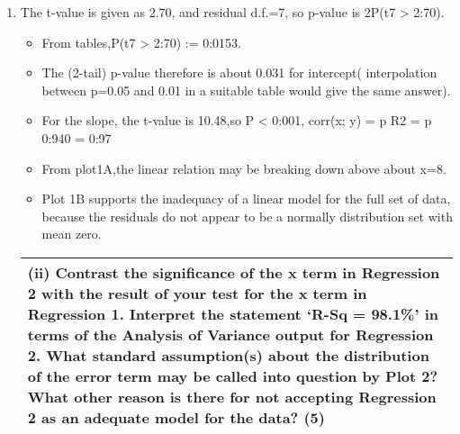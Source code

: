 \documentclass[a4paper,12pt]{article}
\begin{document}
\begin{enumerate}
    \item The t-value is given as 2.70, and residual d.f.=7, so p-value is 2P(t7 > 2:70).
    \begin{itemize}
        \item From tables,P(t7 > 2:70)
:=
0:0153.
    \end{itemize}
\begin{itemize}
    \item The (2-tail) p-value therefore is about 0.031 for intercept(
interpolation between p=0.05 and 0.01 in a suitable table would give the same
answer).
\item For the slope, the t-value is 10.48,so P < 0:001, corr(x; y) =
p
R2 =
p
0:940 = 0:97

\item From plot1A,the linear relation may be breaking down above about x=8. 
\item Plot 1B supports
the inadequacy of a linear model for the full set of data, because the residuals do not appear to be a normally distribution set with mean zero.
\end{itemize}
\newpage
  \begin{table}[ht!]
     \centering
     \begin{tabular}{|p{15cm}|}
     \hline  
 
(ii) Contrast the significance of the x term in Regression 2 with the result of your test for the x term in Regression 1.  Interpret the statement ‘R-Sq = 98.1\%’ in terms of the Analysis of Variance output for Regression 2.  What standard assumption(s) about the distribution of the error term may be called into question by Plot 2?  What other reason is there for not accepting Regression 2 as an adequate model for the data? (5) 
  \\ \hline
      \end{tabular}
    \end{table}
    

\end{enumerate}
\end{document}
